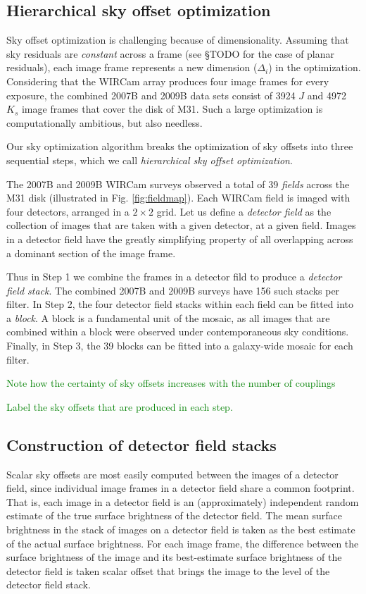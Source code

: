 \documentclass[iop]{emulateapj}
\newcommand{\todo}[1]{\textcolor{green}{#1}}
\begin{document}
\subsection{Hierarchical sky offset optimization}

Sky offset optimization is challenging because of dimensionality. Assuming that sky residuals are \emph{constant} across a frame (see \S TODO for the case of planar residuals), each image frame represents a new dimension ($\Delta_i$) in the optimization. Considering that the WIRCam array produces four image frames for every exposure, the combined 2007B and 2009B data sets consist of 3924 $J$ and 4972 $K_s$ image frames that cover the disk of M31. Such a large optimization is computationally ambitious, but also needless.

Our sky optimization algorithm breaks the optimization of sky offsets into three sequential steps, which we call \emph{hierarchical sky offset optimization}.

The 2007B and 2009B WIRCam surveys observed a total of 39 \emph{fields} across the M31 disk (illustrated in Fig. \ref{fig:fieldmap}). Each WIRCam field is imaged with four detectors, arranged in a $2\times 2$ grid. Let us define a \emph{detector field} as the collection of images that are taken with a given detector, at a given field. Images in a detector field have the greatly simplifying property of all overlapping across a dominant section of the image frame.

Thus in Step 1 we combine the frames in a detector fild to produce a \emph{detector field stack}. The combined 2007B and 2009B surveys have 156 such stacks per filter. In Step 2, the four detector field stacks within each field can be fitted into a \emph{block}. A block is a fundamental unit of the mosaic, as all images that are combined within a block were observed under contemporaneous sky conditions. Finally, in Step 3, the 39 blocks can be fitted into a galaxy-wide mosaic for each filter.

\todo{Note how the certainty of sky offsets increases with the number of couplings}

\todo{Label the sky offsets that are produced in each step.}

\subsection{Construction of detector field stacks}
\label{sec:stacks}

Scalar sky offsets are most easily computed between the images of a detector field, since individual image frames in a detector field share a common footprint. That is, each image in a detector field is an (approximately) independent random estimate of the true surface brightness of the detector field. The mean surface brightness in the stack of images on a detector field is taken as the best estimate of the actual surface brightness. For each image frame, the difference between the surface brightness of the image and its best-estimate surface brightness of the detector field is taken scalar offset that brings the image to the level of the detector field stack.
\end{document}
